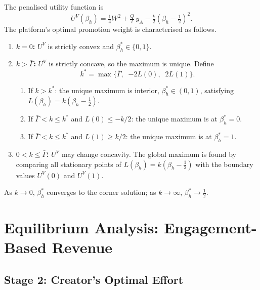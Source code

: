 \documentclass[mnsc,nonblindrev]{informs3_NoOR}
\begin{document}
\begin{proposition}\label{prop:beta-view}
The penalised utility function is
\[
U^V(\beta_h) = \tfrac{1}{4}W^2 + \tfrac{Q}{t}\,y_A  - \tfrac{k}{2}(\beta_h - \tfrac{1}{2})^2.
\]
The platform's optimal promotion weight is characterised as follows.
\begin{enumerate}
\item[\textup{(i)}] \textbf{$k = 0$:} $U^V$ is strictly convex and $\beta_h^* \in \{0,1\}$.
  
\item[\textup{(ii)}] \textbf{$k > \bar\Gamma$:} $U^V$ is strictly concave, so the maximum is unique. Define
\[
k^* = \max\!\big\{\bar\Gamma,\;\; {-2L(0)},\;\; 2L(1)\big\}.
\]
\begin{enumerate}
\item[\textup{(a)}] If $k > k^*$: the unique maximum is interior, $\beta_h^* \in (0,1)$, satisfying $L(\beta_h) = k(\beta_h - \tfrac{1}{2})$.
\item[\textup{(b)}] If $\bar\Gamma < k \leq k^*$ and $L(0) \leq -k/2$: the unique maximum is at $\beta_h^* = 0$.
\item[\textup{(c)}] If $\bar\Gamma < k \leq k^*$ and $L(1) \geq k/2$: the unique maximum is at $\beta_h^* = 1$.
\end{enumerate}
 
\item[\textup{(iii)}] \textbf{$0 < k \leq \bar\Gamma$:} $U^V$ may change concavity. The global maximum is found by comparing all stationary points of $L(\beta_h) = k(\beta_h - \frac{1}{2})$ with the boundary values $U^V(0)$ and $U^V(1)$.
\end{enumerate}
\end{proposition}

\begin{remark}\label{rem:k-view}
As $k \to 0$, $\beta_h^*$ converges to the corner solution; as $k \to \infty$, $\beta_h^* \to \tfrac{1}{2}$.
\end{remark}

\section{Equilibrium Analysis: Engagement-Based Revenue}\label{sec:eng}

\subsection{Stage 2: Creator's Optimal Effort}
\end{document}
